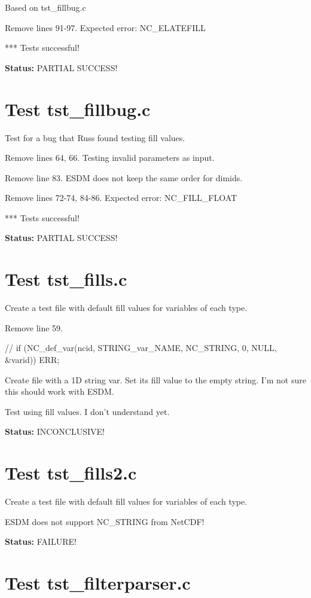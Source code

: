 Based on tst\_fillbug.c

Remove lines 91-97. Expected error: NC\_ELATEFILL

*** Tests successful!

{\bf \large Status: } PARTIAL SUCCESS!

\section{Test tst\_fillbug.c}

Test for a bug that Russ found testing fill values.

Remove lines 64, 66. Testing invalid parameters as input.

Remove line 83. ESDM does not keep the same order for dimids.

Remove lines 72-74, 84-86. Expected error: NC\_FILL\_FLOAT

*** Tests successful!

{\bf \large Status: } PARTIAL SUCCESS!

\section{Test tst\_fills.c}

Create a test file with default fill values for variables of each type.

Remove line 59.

// if (NC\_def\_var(ncid, STRING\_var\_NAME, NC\_STRING, 0, NULL, \&varid)) ERR;

Create file with a 1D string var. Set its fill value to the empty string.
I'm not sure this should work with ESDM.

Test using fill values. I don't understand yet.

{\bf \large Status: } INCONCLUSIVE!

\section{Test tst\_fills2.c}

Create a test file with default fill values for variables of each type.

ESDM does not support NC\_STRING from NetCDF!

{\bf \large Status: } FAILURE!

\section{Test tst\_filterparser.c}

